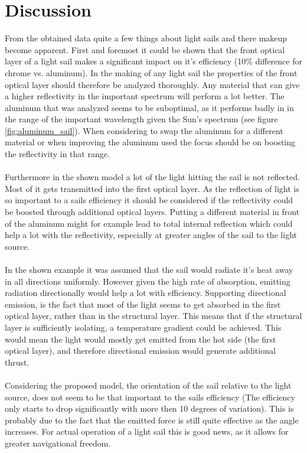 \documentclass[14pt]{article}
\begin{document}
\section{Discussion}
From the obtained data quite a few things about light sails and there makeup become apparent. First and foremost
it could be shown that the front optical layer of a light sail makes a significant impact on it's efficiency (10\% difference
for chrome vs. aluminum). In the making of any light sail the properties of the front optical layer should therefore be analyzed thoroughly.
Any material that can give a higher reflectivity in the important spectrum will perform a lot better. The aluminum
that was analyzed seems to be suboptimal, as it performs badly in in the range of the important wavelength
given the Sun's spectrum (see figure \ref{fig:aluminum_sail}). When considering to swap the aluminum for a different
material or when improving the aluminum used the focus should be on boosting the reflectivity in that range.\\
\\
Furthermore in the shown model a lot of the light hitting the sail is not reflected. Most of it gets transmitted
into the first optical layer. As the reflection of light is so important to a sails efficiency it should be considered
if the reflectivity could be boosted through additional optical layers. Putting a different material in front of
the aluminum might for example lead to total internal reflection which could help a lot with the reflectivity,
especially at greater angles of the sail to the light source.\\
\\
In the shown example it was assumed that the sail would radiate it's heat away in all directions uniformly. However
given the high rate of absorption, emitting radiation directionally would help a lot with efficiency. Supporting 
directional emission, is the fact that most of the light seems to get absorbed in the first optical layer, rather
than in the structural layer. This means that if the structural layer is sufficiently isolating, a temperature gradient
could be achieved. This would mean the light would mostly get emitted from the hot side (the first optical layer),
and therefore directional emission would generate additional thrust.\\
\\
Considering the proposed model, the orientation of the sail relative to the light source, does not seem to be that important 
to the sails efficiency (The efficiency only starts to drop significantly with more then 10 degrees of variation).
This is probably due to the fact that the emitted force is still quite effective as the angle
increases. For actual operation of a light sail this is good news, as it allows for greater navigational freedom. 
\end{document}
